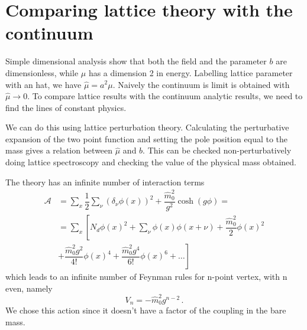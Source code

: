 \documentclass[12pt,a4paper]{report}
\begin{document}
\chapter{Comparing lattice theory with the continuum }

Simple dimensional analysis show that both the field and the parameter $b$ are dimensionless, while $\mu$ has a dimension 2 in energy. Labelling lattice parameter with an hat, we have $\hat \mu = a^2 \mu$. Naively the continuum is limit is obtained  with $\hat \mu \to 0$. To compare lattice results with the continuum analytic results, we need to find the lines of constant physics.

We can do this using lattice perturbation theory. Calculating the perturbative expansion of the two point function and setting the pole position equal to the mass gives a relation between $ \hat \mu$ and $ b$. This can be checked non-perturbatively doing lattice spectroscopy and checking the value of the physical mass obtained.

The theory has an infinite number of interaction terms \begin{align}
\mathcal{A} &= \sum_x \dfrac{1}{2} \sum_\nu  (\delta_\nu \phi(x))^2 + \dfrac{\hat m_0^2}{g^2} \cosh(g \phi) =\\
  &= \sum_x \left[ N_d \phi(x)^2 +  \sum_\nu \phi(x) \phi(x+\nu) +  \dfrac{\hat m_0^2 }{2}\phi(x)^2 \right. \nonumber \\
  &\left. +   \dfrac{ \hat m_0^2 g^2}{4!} \phi(x)^4 +  \dfrac{ \hat m_0^2 g^4}{6!} \phi(x)^6 + \dots  \right]
\end{align} which leads to an infinite number of Feynman rules for n-point vertex, with n even, namely \begin{equation}
V_n = - \hat m_0^2 g^{n-2} \,.
\end{equation} We chose this action since it doesn't have a factor of the coupling in the bare mass. 
 
\end{document}
